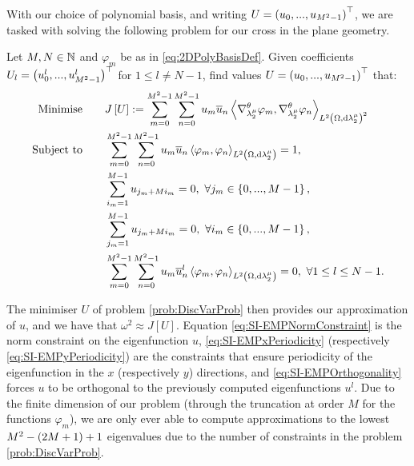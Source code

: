 With our choice of polynomial basis, and writing $U = \left( u_0,...,u_{M^2-1} \right)^\top$, we are tasked with solving the following problem for our cross in the plane geometry.
\begin{problem} \label{prob:DiscVarProb}
	Let $M,N\in\mathbb{N}$ and $\varphi_m$ be as in \eqref{eq:2DPolyBasisDef}.
	Given coefficients $U_l=\left( u^l_0,...,u^l_{M^2-1} \right)^\top$ for $1\leq l\neq N-1$, find values $U=\left( u_0,...,u_{M^2-1} \right)^\top$ that:
	\begin{subequations} \label{eq:SI-ExampleMinProb}
		\begin{align}
			\text{Minimise} \quad & \quad J\left[ U \right] := \sum_{m=0}^{M^2-1}\sum_{n=0}^{M^2-1}u_m\overline{u}_n\left\langle \nabla^{\theta}_{\lambda_2^{\mu}}\varphi_m , \nabla^{\theta}_{\lambda_2^{\mu}}\varphi_n \right\rangle_{L^{2}\left( \Omega,\mathrm{d} \lambda_2^{\mu} \right)^2} 
			\label{eq:SI-EMPObjectiveFn} \\
			\text{Subject to} \quad & \quad \sum_{m=0}^{M^2-1}\sum_{n=0}^{M^2-1}u_m\overline{u}_n\left\langle \varphi_m , \varphi_n \right\rangle_{L^{2}\left( \Omega,\mathrm{d} \lambda_2^{\mu} \right)} = 1, 
			\label{eq:SI-EMPNormConstraint} \\
			& \quad \sum_{i_m=1}^{M-1}u_{j_m+Mi_m} = 0, \ \forall j_m\in\left\{ 0,...,M-1 \right\}, 
			\label{eq:SI-EMPxPeriodicity} \\
			& \quad \sum_{j_m=1}^{M-1}u_{j_m+Mi_m} = 0, \ \forall i_m\in\left\{ 0,...,M-1 \right\},
			\label{eq:SI-EMPyPeriodicity} \\
			& \quad \sum_{m=0}^{M^2-1}\sum_{n=0}^{M^2-1}u_m\overline{u}^l_n\left\langle \varphi_m , \varphi_n \right\rangle_{L^{2}\left( \Omega,\mathrm{d} \lambda_2^{\mu} \right)} = 0, \ \forall 1\leq l\leq N-1.
			\label{eq:SI-EMPOrthogonality}
		\end{align}
	\end{subequations}
\end{problem}
The minimiser $U$ of problem \ref{prob:DiscVarProb} then provides our approximation of $u$, and we have that $\omega^2 \approx J[U]$.
Equation \eqref{eq:SI-EMPNormConstraint} is the norm constraint on the eigenfunction $u$, \eqref{eq:SI-EMPxPeriodicity} (respectively \eqref{eq:SI-EMPyPeriodicity}) are the constraints that ensure periodicity of the eigenfunction in the $x$ (respectively $y$) directions, and \eqref{eq:SI-EMPOrthogonality} forces $u$ to be orthogonal to the previously computed eigenfunctions $u^l$.
Due to the finite dimension of our problem (through the truncation at order $M$ for the functions $\varphi_m$), we are only ever able to compute approximations to the lowest $M^2 - \left( 2M + 1 \right) + 1$ eigenvalues due to the number of constraints in the problem \ref{prob:DiscVarProb}.

